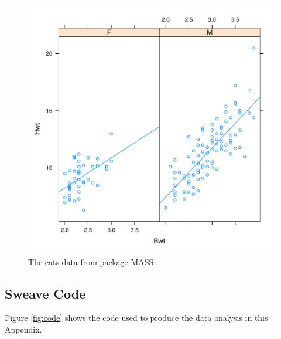 \documentclass[11pt,article,oneside]{memoir}
\begin{document}
\begin{figure}[h!]
  \centering
{} 
\includegraphics{figures/apps-figure}

  \caption{\small The cats data from package MASS.}
  \label{fig:cats}
\end{figure}
\label{sec:append-sweave-exampl}

 
\subsection*{Sweave Code} %
\label{app:sweave_code}

\label{app:sweave-code}
Figure \ref{fig:code} shows the code used to produce the data analysis in this Appendix.
\end{document}
